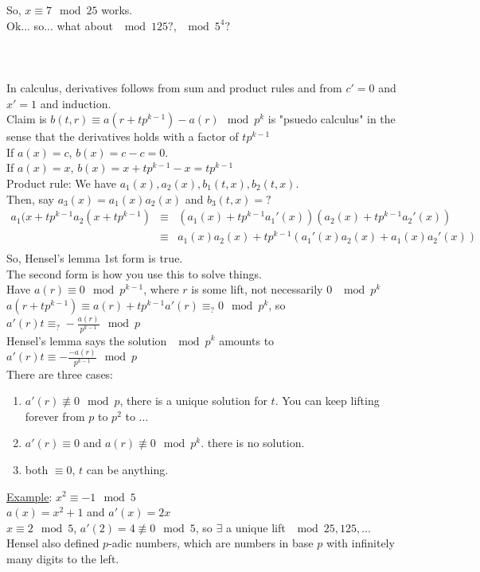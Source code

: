     So, $x \equiv 7 \mod 25$ works.\\
    Ok... so... what about $\mod 125?$, $\mod 5^4?$\\\\
    \\\\
    In calculus, derivatives follows from sum and product rules and from $c' = 0$
    and $x' = 1$ and induction. \\
    Claim is $b(t,r) \equiv a(r+tp^{k-1}) - a(r) \mod p^k$ is "psuedo calculus" 
    in the sense that the derivatives holds with a factor of $tp^{k-1}$\\
    If $a(x) = c$, $b(x) = c - c = 0$.\\
    If $a(x) = x$, $b(x) = x + tp^{k-1} - x = tp^{k-1}$\\
    Product rule: We have $a_1(x), a_2(x), b_1(t,x), b_2(t,x)$.\\
    Then, say $a_3(x) = a_1(x)a_2(x)$ and $b_3(t,x) = ?$\\
    \begin{eqnarray*}
    a_1(x + tp^{k-1}a_2(x + tp^{k-1}) 
    &\equiv& (a_1(x) + tp^{k-1}a_1'(x))(a_2(x) + tp^{k-1}a_2'(x))\\
    &\equiv& a_1(x)a_2(x) + tp^{k-1}(a_1'(x)a_2(x) + a_1(x)a_2'(x))\\
    \end{eqnarray*}
    So, Hensel's lemma 1st form is true.\\
    The second form is how you use this to solve things.\\
    Have $a(r) \equiv 0 \mod p^{k-1}$, where $r$ is some lift, not necessarily
    0 $\mod p^k$\\
    $a(r + tp^{k-1}) \equiv a(r) + tp^{k-1}a'(r) \equiv_? 0 \mod p^k$, so
    $a'(r)t \equiv_? -\frac{a(r)}{p^{k-1}} \mod p$\\
    Hensel's lemma says the solution $\mod p^k$ amounts to $a'(r)t \equiv
    -\frac{-a(r)}{p^{k-1}} \mod p$\\
    There are three cases:
    \begin{enumerate}
      \item $a'(r) \not\equiv 0 \mod p$, there is a unique solution for $t$. You 
      can keep lifting forever from $p$ to $p^2$ to $\ldots$
      \item $a'(r) \equiv 0$ and $a(r) \not\equiv 0 \mod p^k$. there is no 
        solution.
      \item both $\equiv 0$, $t$ can be anything. 
    \end{enumerate}
    \underline{Example}: $x^2 \equiv -1 \mod 5$\\
    $a(x) = x^2 + 1$ and $a'(x) = 2x$\\
    $x \equiv 2 \mod 5$, $a'(2) = 4 \not\equiv 0 \mod 5$, so $\exists$ a unique
    lift $\mod 25, 125, \ldots$\\
    Hensel also defined $p$-adic numbers, which are numbers in base $p$ with 
    infinitely many digits to the left. 
